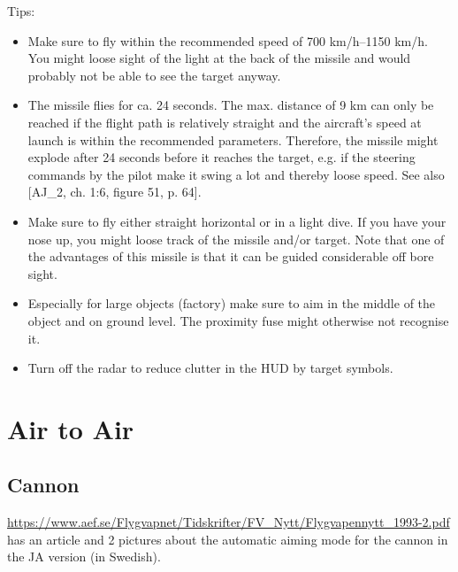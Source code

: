 {\begin{itemize}
\end{itemize}

Tips:
\begin{itemize}
 \item Make sure to fly within the recommended speed of 700 km/h--1150 km/h. You might loose sight of the light at the back of the missile and would probably not be able to see the target anyway.
 \item The missile flies for ca. 24 seconds. The max. distance of 9 km can only be reached if the flight path is relatively straight and the aircraft's speed at launch is within the recommended parameters. Therefore, the missile might explode after 24 seconds before it reaches the target, e.g. if the steering commands by the pilot make it swing a lot and thereby loose speed. See also [AJ\_2, ch. 1:6, figure 51, p. 64].
 \item Make sure to fly either straight horizontal or in a light dive. If you have your nose up, you might loose track of the missile and/or target. Note that one of the advantages of this missile is that it can be guided considerable off bore sight.
 \item Especially for large objects (factory) make sure to aim in the middle of the object and on ground level. The proximity fuse might otherwise not recognise it.
 \item Turn off the radar  to reduce clutter in the HUD by target symbols.
\end{itemize}

}{}

\chapter{Air to Air}

\section{Cannon}
\url{https://www.aef.se/Flygvapnet/Tidskrifter/FV_Nytt/Flygvapennytt_1993-2.pdf} has an article and 2 pictures about the automatic aiming mode for the cannon in the JA version (in Swedish).

